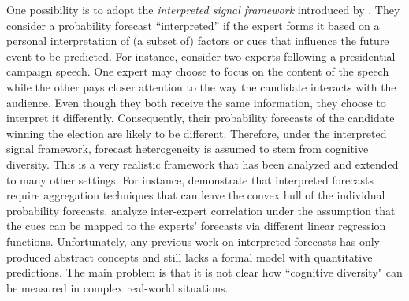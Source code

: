 \documentclass[11pt]{article}
\theoremstyle{definition}
\theoremstyle{definition}
\begin{document}
One possibility is to adopt the \textit{interpreted signal framework} introduced by \cite{hong2009interpreted}. They consider a probability forecast ``interpreted'' if the expert forms it based on a personal interpretation of (a subset of) factors or cues that influence the future event to be predicted. For instance, consider two experts following a presidential campaign speech. One expert may choose to focus on the content of the speech while the other pays closer attention to the way the candidate interacts with the audience.  Even though they both receive the same information, they choose to interpret it differently. Consequently, their probability forecasts of the candidate winning the election are likely to be different. Therefore, under the interpreted signal framework, forecast heterogeneity is assumed to stem from cognitive diversity. This is a very realistic framework that has been analyzed and extended to many other settings. For instance, \cite{parunak2013characterizing} demonstrate that interpreted forecasts require aggregation techniques that can leave the convex hull of the individual probability forecasts. \cite{broomell2009experts} analyze inter-expert correlation under the assumption that the cues can be mapped to the experts' forecasts via different linear regression functions. Unfortunately, any previous work on interpreted forecasts has only produced abstract concepts and still lacks a formal model with quantitative predictions. The main problem is that it is not clear how ``cognitive diversity" can be measured in complex real-world situations.
 
\end{document}
